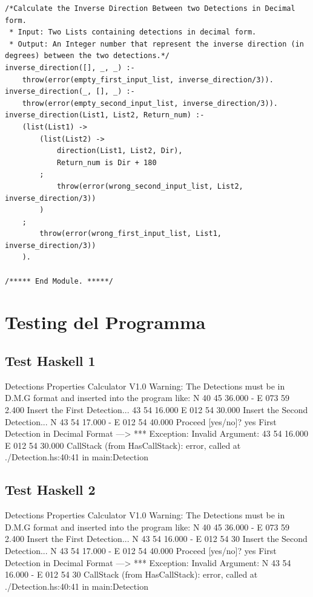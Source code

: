 \documentclass{article}
\begin{document}
\begin{lstlisting}
/*Calculate the Inverse Direction Between two Detections in Decimal form.
 * Input: Two Lists containing detections in decimal form.
 * Output: An Integer number that represent the inverse direction (in degrees) between the two detections.*/
inverse_direction([], _, _) :-
    throw(error(empty_first_input_list, inverse_direction/3)).
inverse_direction(_, [], _) :-
    throw(error(empty_second_input_list, inverse_direction/3)).
inverse_direction(List1, List2, Return_num) :-
    (list(List1) -> 
        (list(List2) -> 
            direction(List1, List2, Dir),
            Return_num is Dir + 180
        ;
            throw(error(wrong_second_input_list, List2, inverse_direction/3))
        )
    ;
        throw(error(wrong_first_input_list, List1, inverse_direction/3))
    ).
    
/***** End Module. *****/
\end{lstlisting}
\newpage

\section{Testing del Programma}
\subsection*{Test Haskell 1}
	\begin{spverbatim}
		Detections Properties Calculator V1.0 
		Warning: The Detections must be in D.M.G format and inserted into the program like: N 40 45 36.000 - E 073 59 2.400
		Insert the First Detection...
		43 54 16.000  E 012 54 30.000
		Insert the Second Detection...
		N 43 54 17.000 - E 012 54 40.000
		Proceed [yes/no]?
		yes
		First Detection in Decimal Format ---> *** Exception: Invalid Argument: 43 54 16.000  E 012 54 30.000
		CallStack (from HasCallStack):
		error, called at ./Detection.hs:40:41 in main:Detection
	\end{spverbatim}

\subsection*{Test Haskell 2}
	\begin{spverbatim}
		Detections Properties Calculator V1.0 
		Warning: The Detections must be in D.M.G format and inserted into the program like: N 40 45 36.000 - E 073 59 2.400
		Insert the First Detection...
		N 43 54 16.000 - E 012 54 30
		Insert the Second Detection...
		N 43 54 17.000 - E 012 54 40.000
		Proceed [yes/no]?
		yes
		First Detection in Decimal Format ---> *** Exception: Invalid Argument: N 43 54 16.000 - E 012 54 30
		CallStack (from HasCallStack):
		error, called at ./Detection.hs:40:41 in main:Detection
	\end{spverbatim}
\end{document}

